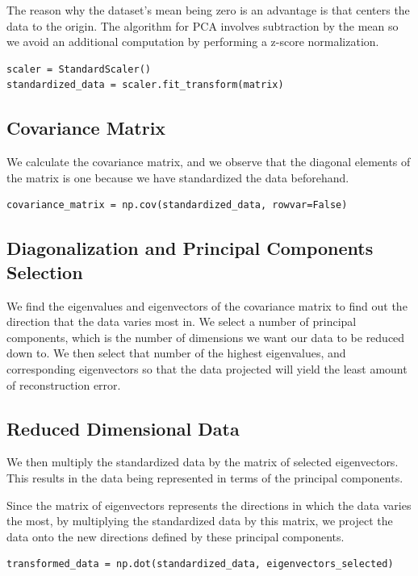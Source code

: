 \documentclass[conference]{IEEEtran}
\begin{document}
The reason why the dataset's mean being zero is an advantage is that centers the data to the origin. The algorithm for PCA involves subtraction by the mean so we avoid an additional computation by performing a z-score normalization.

\begin{lstlisting}[breaklines]
scaler = StandardScaler()
standardized_data = scaler.fit_transform(matrix)
\end{lstlisting}

\subsection{Covariance Matrix}

We calculate the covariance matrix, and we observe that the diagonal elements of the matrix is one because we have standardized the data beforehand.
\begin{lstlisting}[breaklines]
covariance_matrix = np.cov(standardized_data, rowvar=False)
\end{lstlisting}

\subsection{Diagonalization and Principal Components Selection}

We find the eigenvalues and eigenvectors of the covariance matrix to find out the direction that the data varies most in. We select a  number of principal components, which is the number of dimensions we want our data to be reduced down to. We then select that number of the highest eigenvalues, and corresponding eigenvectors so that the data projected will yield the least amount of reconstruction error.

\subsection{Reduced Dimensional Data}

We then multiply the standardized data by the matrix of selected eigenvectors. This results in the data being represented in terms of the principal components.

Since the matrix of eigenvectors represents the directions in which the data varies the most, by multiplying the standardized data by this matrix, we project the data onto the new directions defined by these principal components.

\begin{lstlisting}[breaklines]
transformed_data = np.dot(standardized_data, eigenvectors_selected)
\end{lstlisting}
\end{document}
